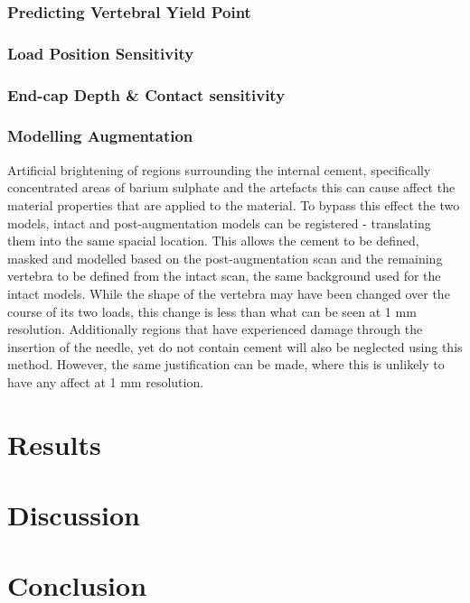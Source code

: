 \subsubsection{Predicting Vertebral Yield Point}\label{predYield}

\subsubsection{Load Position Sensitivity}

\subsubsection{End-cap Depth \& Contact sensitivity}

\subsubsection{Modelling Augmentation}

Artificial brightening of regions surrounding
the internal cement, specifically concentrated areas of barium sulphate and the
artefacts this can cause affect the material properties that are applied to the
material.
To bypass this effect the two models, intact and post-augmentation models can be
registered - translating them into the same spacial location.
This allows the cement to be defined, masked and modelled based on the
post-augmentation scan and the remaining vertebra to be defined from the intact
scan, the same background used for the intact models.
While the shape of the vertebra may have been changed over the course of its
two loads, this change is less than what can be seen at 1 mm resolution.
Additionally regions that have experienced damage through the insertion of the
needle, yet do not contain cement will also be neglected using this method.
However, the same justification can be made, where this is unlikely to have any
affect at 1 mm resolution.


\section{Results}

\section{Discussion}

\section{Conclusion}







